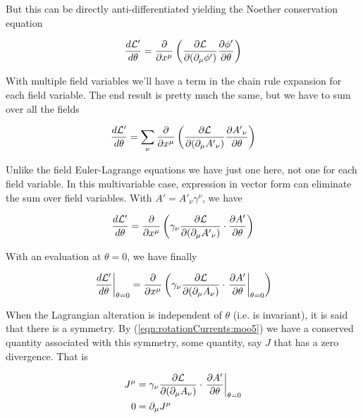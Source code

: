 But this can be directly anti-differentiated yielding the Noether conservation equation

\begin{align}\label{eqn:rotationCurrents:moo2}
\frac{d \mathcal{L}'}{d \theta}
=
\frac{\partial {}}{\partial {x^\mu}} \left( \frac{\partial {\mathcal{L}}}{\partial {(\partial_\mu \phi')}} \frac{\partial {\phi'}}{\partial {\theta}} \right)
\end{align}

With multiple field variables we'll have a term in the chain rule expansion for each field variable.  The end result is pretty much the same, but we have to sum over all the fields

\begin{align}\label{eqn:rotationCurrents:moo3}
\frac{d \mathcal{L}'}{d \theta}
=
\sum_\nu \frac{\partial {}}{\partial {x^\mu}} \left( \frac{\partial {\mathcal{L}}}{\partial {(\partial_\mu {A'}_\nu)}} \frac{\partial {{A'}_\nu}}{\partial {\theta}} \right)
\end{align}

Unlike the field Euler-Lagrange equations we have just one here, not one for each field variable.  In this multivariable case, expression in vector form can eliminate the sum over field variables.  With $A' = {A'}_\nu \gamma^\nu$, we have

\begin{align}\label{eqn:rotationCurrents:moo4}
\frac{d \mathcal{L}'}{d \theta}
=
\frac{\partial {}}{\partial {x^\mu}} \left( \gamma_\nu \frac{\partial {\mathcal{L}}}{\partial {(\partial_\mu {A'}_\nu)}} \cdot \frac{\partial {A'}}{\partial {\theta}} \right)
\end{align}

With an evaluation at $\theta = 0$, we have finally

\begin{align}\label{eqn:rotationCurrents:moo5}
{\left. \frac{d \mathcal{L}'}{d \theta} \right\vert}_{\theta=0}
=
\frac{\partial {}}{\partial {x^\mu}} \left( \gamma_\nu \frac{\partial {\mathcal{L}}}{\partial {(\partial_\mu {A}_\nu)}} \cdot {\left. \frac{\partial {A'}}{\partial {\theta}} \right\vert}_{\theta=0}\right)
\end{align}

When the Lagrangian alteration is independent of $\theta$ (i.e. is invariant), it is said that there is a symmetry.  By (\ref{eqn:rotationCurrents:moo5}) we have a conserved quantity associated with this symmetry, some quantity, say $J$ that has a zero divergence.   That is

\begin{align}\label{eqn:rotationCurrents:moo6}
J^\mu &= \gamma_\nu \frac{\partial {\mathcal{L}}}{\partial {(\partial_\mu {A}_\nu)}} \cdot {\left. \frac{\partial {A'}}{\partial {\theta}} \right\vert}_{\theta=0} \\
0 &= \partial_\mu J^\mu
\end{align}


